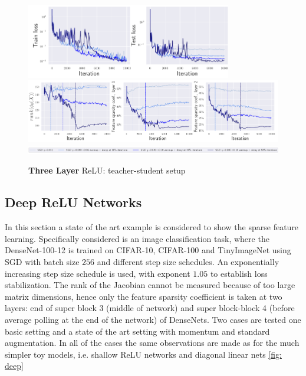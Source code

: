\begin{figure}[H]
    \centering
    \includegraphics[width=0.8\textwidth]{./pics/relu3_loss.png}
    \includegraphics[width=\textwidth]{./pics/relu3_sparsity.png}
    \includegraphics[width=\textwidth]{./pics/relu3_setup.png}
    \caption{\textbf{Three Layer} ReLU: teacher-student setup \label{ref: relu3}}
\end{figure}

\subsection{Deep ReLU Networks}
In this section a state of the art example is considered to show the sparse
feature learning. Specifically considered is an image classification task,
where the DenseNet-100-12 is trained on CIFAR-10, CIFAR-100 and TinyImageNet
using SGD with batch size $256$ and different step size schedules. An
exponentially increasing step size schedule is used, with exponent $1.05$ to
establish loss stabilization. The rank of the Jacobian cannot be measured
because of too large matrix dimensions, hence only the feature sparsity
coefficient is taken at two layers: end of super block 3 (middle of network)
and super block-block 4 (before average polling at the end of the network) of
DenseNets. Two cases are tested one basic setting and a state of the art
setting with momentum and standard augmentation. In all of the cases the same
observations are made as for the much simpler toy models, i.e. shallow ReLU
networks and diagonal linear nets \ref{fig: deep}

